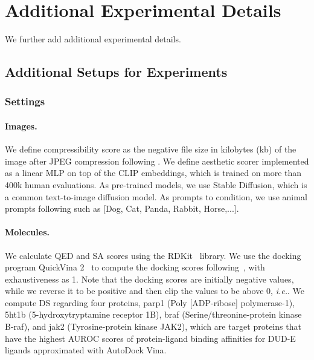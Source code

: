 \section{Additional Experimental Details}\label{sec:additional} 

We further add additional experimental details. 

\subsection{Additional Setups for Experiments}

\subsubsection{Settings}

\paragraph{Images.} We define compressibility score as the negative file size
in kilobytes (kb) of the image after JPEG compression following \citep{black2023training}. 
We define aesthetic scorer implemented as a linear MLP on top of the CLIP embeddings, which is trained on more than 400k human evaluations. As pre-trained models, we use Stable Diffusion, which is a common text-to-image diffusion model. As prompts to condition, we use animal prompts following \citep{black2023training} such as [Dog, Cat, Panda, Rabbit, Horse,...]. 

\paragraph{Molecules.}

We calculate QED and SA scores using the RDKit~\citep{landrum2016rdkit} library. We use the docking program QuickVina 2~\citep{alhossary2015fast} to compute the docking scores following~\citet{yang2021hit}, with exhaustiveness as 1. Note that the docking scores are initially negative values, while we reverse it to be positive and then clip the values to be above 0, \textit{i.e.}. We compute DS regarding four proteins, {parp1} (Poly [ADP-ribose] polymerase-1),
{5ht1b} (5-hydroxytryptamine receptor 1B), {braf} (Serine/threonine-protein kinase B-raf), and {jak2} (Tyrosine-protein kinase JAK2), which are target proteins that have the highest AUROC scores of protein-ligand binding affinities for DUD-E ligands approximated with AutoDock Vina.


